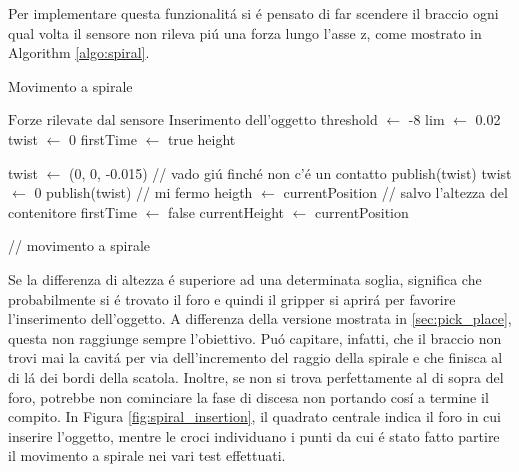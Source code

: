 Per implementare questa funzionalit\'{a} si \'{e} pensato di far scendere il braccio ogni qual volta il sensore non rileva pi\'{u}
una forza lungo l'asse z, come mostrato in Algorithm \ref{algo:spiral}. 
\newpage
\begin{algorithm}[H]
    \caption{Movimento a spirale}\label{algo:spiral}
    \begin{algorithmic}[1]
        \Require $\text{Forze rilevate dal sensore}$
        \Ensure $\text{Inserimento dell'oggetto}$
        \State threshold $\gets$ -8
        \State lim $\gets$ 0.02
        \State twist $\gets$ 0
        \State firstTime $\gets$ true
        \State height
        
        \Repeat 
                \State twist $\gets$ (0, 0, -0.015) // vado gi\'{u} finch\'{e} non c'\'{e} un contatto
                \State publish(twist)
            \EndWhile
            \State twist $\gets$ 0
            \State publish(twist) // mi fermo
                \State heigth $\gets$ currentPosition // salvo l'altezza del contenitore
                \State firstTime $\gets$ false
            \EndIf
            \State currentHeight $\gets$ currentPosition

                // movimento a spirale
            \EndWhile
    \end{algorithmic}
    \end{algorithm}
Se la differenza di altezza \'{e} superiore ad una determinata soglia, significa che probabilmente si \'{e} 
trovato il foro e quindi il gripper si aprir\'{a} per favorire l'inserimento dell'oggetto. 
A differenza della versione mostrata in \ref{sec:pick_place}, questa non raggiunge sempre l'obiettivo. 
Pu\'{o} capitare, infatti, che il braccio non trovi mai la cavit\'{a} per via dell'incremento del raggio della spirale e che finisca 
al di l\'{a} dei bordi della scatola. Inoltre, se non si trova perfettamente al di sopra del foro, potrebbe non cominciare la 
fase di discesa non portando cos\'{i} a termine il compito. 
In Figura \ref{fig:spiral_insertion}, il quadrato centrale indica il foro in cui inserire l'oggetto, mentre le croci individuano i 
punti da cui \'{e} stato fatto partire il movimento a spirale nei vari test effettuati. 
